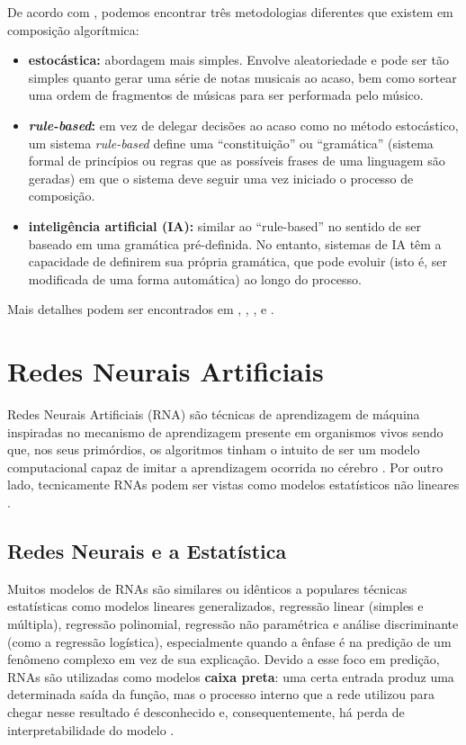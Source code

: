 \documentclass{automatextcc}
\begin{document}
De acordo com \citet{maurer}, podemos encontrar três metodologias diferentes que existem em composição algorítmica: 
\begin{itemize}
    \item \textbf{estocástica:} abordagem mais simples. Envolve aleatoriedade e pode ser tão simples quanto gerar uma série de notas musicais ao acaso, bem como sortear uma ordem de fragmentos de músicas para ser performada pelo músico.
    \item \textbf{\textit{rule-based}:} em vez de delegar decisões ao acaso como no método estocástico, um sistema \textit{rule-based} define uma ``constituição'' ou ``gramática'' (sistema formal de princípios ou regras que as possíveis frases de uma linguagem são geradas) em que o sistema deve seguir uma vez iniciado o processo de composição. 
    \item \textbf{inteligência artificial (IA): }similar ao ``rule-based'' no sentido de ser baseado em uma gramática pré-definida. No entanto, sistemas de IA têm a capacidade de definirem sua própria gramática, que pode evoluir (isto é, ser modificada de uma forma automática) ao longo do processo.
\end{itemize}
Mais detalhes podem ser encontrados em \citet{alpern1995}, \citet{maurer}, \citet{nierhaus2009}, \citet{fernandez2013} e \citet{olivan2021}.  



\section{Redes Neurais Artificiais}
Redes Neurais Artificiais (RNA) são técnicas de aprendizagem de máquina inspiradas no mecanismo de aprendizagem presente em organismos vivos \citep{aggarwal2018} sendo que, nos seus primórdios, os algoritmos tinham o intuito de ser um modelo computacional capaz de imitar a aprendizagem ocorrida no cérebro \citep{goodfellow2016}.  Por outro lado, tecnicamente RNAs podem ser vistas como modelos estatísticos não lineares \citep{hastie2008}.



\subsection{Redes Neurais e a Estatística}
Muitos modelos de RNAs são similares ou idênticos a populares técnicas estatísticas como modelos lineares generalizados, regressão linear (simples e múltipla), regressão polinomial, regressão não paramétrica e análise discriminante (como a regressão logística), especialmente quando a ênfase é na predição de um fenômeno complexo em vez de sua explicação. Devido a esse foco em predição, RNAs são utilizadas como modelos \textbf{caixa preta}: uma certa entrada produz uma determinada saída da função, mas o processo interno que a rede utilizou para chegar nesse resultado é desconhecido e, consequentemente, há perda de interpretabilidade do modelo \citep{sarle1994, cheng1994, rojas1996}.
\end{document}
